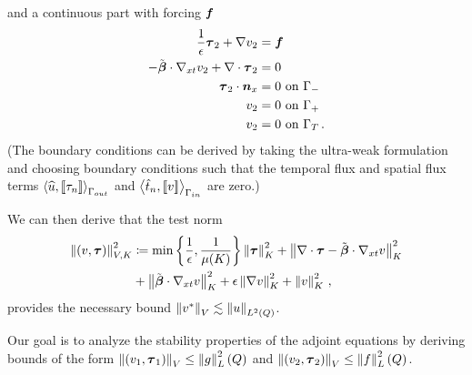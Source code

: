 \documentclass{article}
\begin{document}
and a continuous part with forcing $\boldsymbol f$
\begin{align*}
\frac{1}{\epsilon}\boldsymbol\tau_2+\nabla v_2 &=\boldsymbol f\\
-\tilde{\boldsymbol\beta}\cdot\nabla_{xt} v_2 + \nabla\cdot\boldsymbol\tau_2 &= 0\\
\boldsymbol\tau_2\cdot\boldsymbol n_x &= 0 \text{ on } \Gamma_-\\
v_2 &= 0 \text{ on } \Gamma_+\\
v_2 &= 0 \text{ on } \Gamma_T\,.
\end{align*}
(The boundary conditions can be derived by taking the ultra-weak formulation and choosing boundary conditions such that the temporal flux and spatial flux terms $\left\langle \widehat{u}, \left[ \![\tau_n]\! \right] \right\rangle_{\Gamma_{out}}$ and $\left\langle \hat t_n,\left[ \![v]\! \right] \right\rangle_{\Gamma_{in}}$ are zero.)

We can then derive that the test norm
\begin{align}
\left\| \left( v,\boldsymbol\tau \right) \right\|_{V,K}^2 &\coloneqq
\min\left\{\frac{1}{\epsilon},\frac{1}{\mu(K)}\right\}\left\| \boldsymbol\tau \right\|_K^2
+ \left\| \nabla\cdot \boldsymbol\tau - \tilde{\boldsymbol\beta}\cdot\nabla_{xt} v \right\|_K^2 \nonumber\\
&+\left\| \tilde{\boldsymbol\beta}\cdot \nabla_{xt} v \right\|_K^2
+ \epsilon\left\| \nabla v \right\|_K^2
+ \left\| v \right\|^2_K\,,
\end{align}
provides the necessary bound $\left\| v^* \right\|_V \lesssim \left\| u \right\|_{L^2\left( Q \right)}$.

Our goal is to analyze the stability properties of the adjoint equations by deriving bounds of the form
$\left\| (v_1,\boldsymbol\tau_1) \right\|_V\leq\left\| g \right\|_L^2\left( Q \right)$ and $\left\| (v_2,\boldsymbol\tau_2) \right\|_V\leq\left\| f \right\|_L^2\left( Q \right)$.
\end{document}

